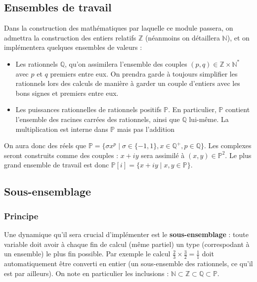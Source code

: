 \documentclass[french]{article}
\begin{document}
\subsection{Ensembles de travail} \label{ensembles}


Dans la construction des mathématiques par laquelle ce module passera, on admettra la construction des entiers relatifs $\mathbb{Z}$ (néanmoins on détaillera $\mathbb{N}$), et on implémentera quelques ensembles de valeurs :
\begin{itemize}
    \item Les rationnels $\mathbb{Q}$, qu'on assimilera l'ensemble des couples $(p, q) \in \mathbb{Z} \times \mathbb{N}^*$ avec $p$ et $q$ premiers entre eux. On prendra garde à toujours simplifier les rationnels lors des calculs de manière à garder un couple d'entiers avec les bons signes et premiers entre eux.
    \item Les puissances rationnelles de rationnels positifs $\mathbb{P}$. En particulier, $\mathbb{P}$ contient l'ensemble des racines carrées des rationnels, ainsi que $\mathbb{Q}$ lui-même. La multiplication est interne dans $\mathbb{P}$ mais pas l'addition
\end{itemize}

On aura donc des réels que $\mathbb{P} = \{\sigma x^p \mid \sigma \in \{-1, 1\}, x \in \mathbb{Q}^+, p \in \mathbb{Q}\}$. Les complexes seront construits comme des couples : $x + iy$ sera assimilé à $(x, y) \in \mathbb{P}^2$. Le plus grand ensemble de travail est donc $\mathbb{P}[i] = \{x + iy \mid x, y \in \mathbb{P}\}$.

\subsection{Sous-ensemblage}

\subsubsection{Principe}

Une dynamique qu'il sera crucial d'implémenter est le \textbf{sous-ensemblage} : toute variable doit avoir à chaque fin de calcul (même partiel) un type (correspodant à un ensemble) le plus fin possible. Par exemple le calcul $\frac{2}{3} \times \frac{3}{2} = \frac{1}{1}$ doit automatiquement être converti en entier (un sous-ensemble des rationnels, ce qu'il est par ailleurs). On note en particulier les inclusions : $\mathbb{N} \subset \mathbb{Z} \subset \mathbb{Q} \subset \mathbb{P}$.
\end{document}
